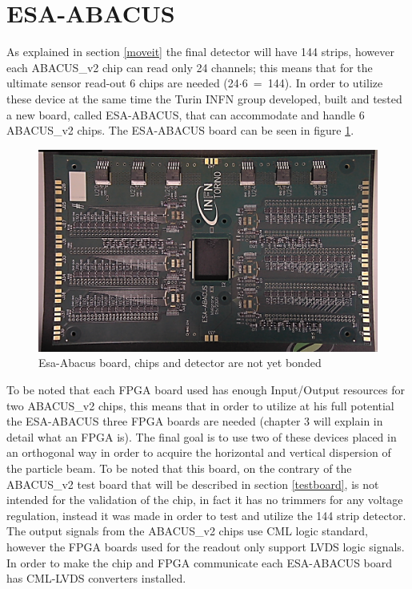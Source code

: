 \section{ESA-ABACUS}\label{esaabacus}
\noindent As explained in section \ref{moveit} the final detector will have 144 strips, however each ABACUS\_v2 chip can read only 24 channels; this means that for the ultimate sensor read-out 6 chips are needed (24$\cdot$6~=~144).
In order to utilize these device at the same time the Turin INFN group developed, built and tested a new board, called ESA-ABACUS, that can accommodate and handle 6 ABACUS\_v2 chips. The ESA-ABACUS board can be seen in figure \ref{fig:esaabacus}.
\begin{figure}[H]
	\centering
	\includegraphics[width=0.7\linewidth]{IMG/ch2/EsaAbacus.png}
	\caption{Esa-Abacus board, chips and detector are not yet bonded}
	\label{fig:esaabacus}
\end{figure}
\noindent To be noted that each FPGA board used has enough Input/Output resources for two ABACUS\_v2 chips, this means that in order to utilize at his full potential the ESA-ABACUS three FPGA boards are needed (chapter 3 will explain in detail what an FPGA is).
The final goal is to use two of these devices placed in an orthogonal way in order to acquire the horizontal and vertical dispersion of the particle beam.
To be noted that this board, on the contrary of the ABACUS\_v2 test board that will be described in section \ref{testboard}, is not intended for the validation of the chip, in fact it has no trimmers for any voltage regulation, instead it was made in order to test and utilize the 144 strip detector.
The output signals from the ABACUS\_v2 chips use CML logic standard, however the FPGA boards used for the readout only support LVDS logic signals. In order to make the chip and FPGA communicate each ESA-ABACUS board has CML-LVDS converters installed.


